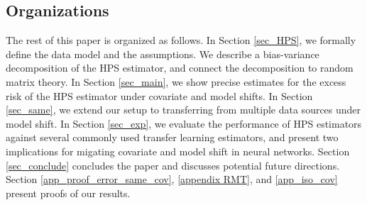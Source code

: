 \subsection{Organizations}
The rest of this paper is organized as follows.
In Section \ref{sec_HPS}, we formally define the data model and the assumptions.
We describe a bias-variance decomposition of the HPS estimator, and connect the decomposition to random matrix theory.
In Section \ref{sec_main}, we show precise estimates for the excess risk of the HPS estimator under covariate and model shifts.
In Section \ref{sec_same}, we extend our setup to transferring from multiple data sources under model shift.
In Section \ref{sec_exp}, we evaluate the performance of HPS estimators against several commonly used transfer learning estimators, and present two implications for migating covariate and model shift in neural networks.
Section \ref{sec_conclude} concludes the paper and discusses potential future directions.
Section \ref{app_proof_error_same_cov}, \ref{appendix RMT}, and \ref{app_iso_cov} present proofs of our results.